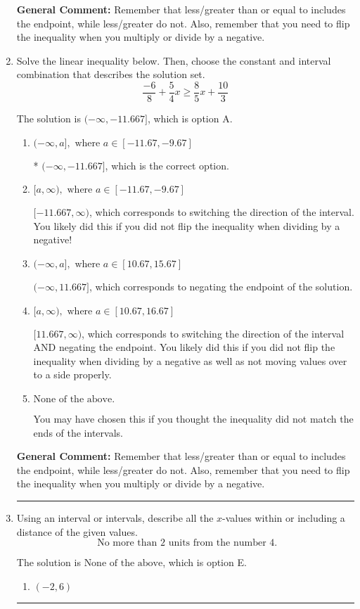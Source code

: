 \documentclass{extbook}[14pt]
\newcommand{\litem}[1]{\item #1

\rule{\textwidth}{0.4pt}}
\begin{document}
\begin{enumerate}
{\textbf{General Comment:} Remember that less/greater than or equal to includes the endpoint, while less/greater do not. Also, remember that you need to flip the inequality when you multiply or divide by a negative.
}
\litem{
Solve the linear inequality below. Then, choose the constant and interval combination that describes the solution set.
\[ \frac{-6}{8} + \frac{5}{4} x \geq \frac{8}{5} x + \frac{10}{3} \]

The solution is \( (-\infty, -11.667] \), which is option A.\begin{enumerate}[label=\Alph*.]
\item \( (-\infty, a], \text{ where } a \in [-11.67, -9.67] \)

* $(-\infty, -11.667]$, which is the correct option.
\item \( [a, \infty), \text{ where } a \in [-11.67, -9.67] \)

 $[-11.667, \infty)$, which corresponds to switching the direction of the interval. You likely did this if you did not flip the inequality when dividing by a negative!
\item \( (-\infty, a], \text{ where } a \in [10.67, 15.67] \)

 $(-\infty, 11.667]$, which corresponds to negating the endpoint of the solution.
\item \( [a, \infty), \text{ where } a \in [10.67, 16.67] \)

 $[11.667, \infty)$, which corresponds to switching the direction of the interval AND negating the endpoint. You likely did this if you did not flip the inequality when dividing by a negative as well as not moving values over to a side properly.
\item \( \text{None of the above}. \)

You may have chosen this if you thought the inequality did not match the ends of the intervals.
\end{enumerate}

\textbf{General Comment:} Remember that less/greater than or equal to includes the endpoint, while less/greater do not. Also, remember that you need to flip the inequality when you multiply or divide by a negative.
}
\litem{
Using an interval or intervals, describe all the $x$-values within or including a distance of the given values.
\[ \text{ No more than } 2 \text{ units from the number } 4. \]

The solution is \( \text{None of the above} \), which is option E.\begin{enumerate}[label=\Alph*.]
\item \( (-2, 6) \)


\end{enumerate}}
\end{enumerate}
\end{document}

